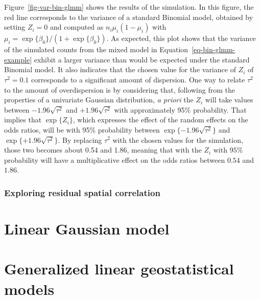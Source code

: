 \documentclass[
  letterpaper,
]{krantz}
\begin{document}
Figure~\ref{fig-var-bin-glmm} shows the results of the simulation. In
this figure, the red line corresponds to the variance of a standard
Binomial model, obtained by setting \(Z_i=0\) and computed as
\(n_i \mu_i (1-\mu_i)\) with
\(\mu_i = \exp\{\beta_0\}/(1+\exp\{\beta_0\})\). As expected, this plot
shows that the variance of the simulated counts from the mixed model in
Equation~\ref{eq-bin-glmm-example} exhibit a larger variance than would
be expected under the standard Binomial model. It also indicates that
the chosen value for the variance of \(Z_i\) of \(\tau^2 = 0.1\)
corresponds to a significant amount of dispersion. One way to relate
\(\tau^2\) to the amount of overdispersion is by considering that,
following from the properties of a univariate Gaussian distribution,
\emph{a priori} the \(Z_i\) will take values between
\(-1.96 \sqrt{\tau^2}\) and \(+1.96 \sqrt{\tau^2}\) with approximately
95\(\%\) probability. That implies that \(\exp\{Z_i\}\), which expresses
the effect of the random effects on the odds ratios, will be with
95\(\%\) probability between \(\exp\{-1.96 \sqrt{\tau^2}\}\) and
\(\exp\{+1.96 \sqrt{\tau^2}\}\). By replacing \(\tau^2\) with the chosen
values for the simulation, those two becomes about 0.54 and 1.86,
meaning that with the \(Z_i\) with \(95\%\) probability will have a
multiplicative effect on the odds ratios between \(0.54\) and \(1.86\).

\hypertarget{exploring-residual-spatial-correlation}{%
\subsection{Exploring residual spatial
correlation}\label{exploring-residual-spatial-correlation}}


\hypertarget{linear-gaussian-model}{%
\chapter{Linear Gaussian model}\label{linear-gaussian-model}}


\hypertarget{generalized-linear-geostatistical-models}{%
\chapter{Generalized linear geostatistical
models}\label{generalized-linear-geostatistical-models}}

\end{document}

